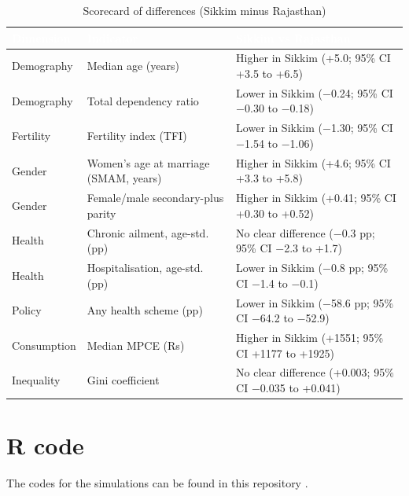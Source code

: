 \documentclass[10pt,a4paper]{article}
\begin{document}
\begin{table}[!htb]\centering
\caption{Scorecard of differences (Sikkim minus Rajasthan)}
\begin{tabular}{>{\raggedright\arraybackslash}p{2.32cm}>{\raggedright\arraybackslash}p{5.92cm}>{\raggedright\arraybackslash}p{7.92cm}}
\toprule
\rowcolor{navy}\textcolor{white}{\textbf{Dimension}} & \textcolor{white}{\textbf{Indicator}} & \textcolor{white}{\textbf{Sikkim vs Rajasthan}} \\
\midrule
Demography & Median age (years) & Higher in Sikkim (+5.0; 95\% CI +3.5 to +6.5) \\
Demography & Total dependency ratio & Lower in Sikkim ($-$0.24; 95\% CI $-$0.30 to $-$0.18) \\
Fertility & Fertility index (TFI) & Lower in Sikkim ($-$1.30; 95\% CI $-$1.54 to $-$1.06) \\
Gender & Women's age at marriage (SMAM, years) & Higher in Sikkim (+4.6; 95\% CI +3.3 to +5.8) \\
Gender & Female/male secondary-plus parity & Higher in Sikkim (+0.41; 95\% CI +0.30 to +0.52) \\
Health & Chronic ailment, age-std. (pp) & No clear difference ($-$0.3 pp; 95\% CI $-$2.3 to +1.7) \\
Health & Hospitalisation, age-std. (pp) & Lower in Sikkim ($-$0.8 pp; 95\% CI $-$1.4 to $-$0.1) \\
Policy & Any health scheme (pp) & Lower in Sikkim ($-$58.6 pp; 95\% CI $-$64.2 to $-$52.9) \\
Consumption & Median MPCE (Rs) & Higher in Sikkim (+1551; 95\% CI +1177 to +1925) \\
Inequality & Gini coefficient & No clear difference (+0.003; 95\% CI $-$0.035 to +0.041) \\
\bottomrule
\end{tabular}
\begin{minipage}{\textwidth}\par\vspace{2pt}{\footnotesize\itshape Notes: ``clear'' means the 95\% interval for the difference excludes zero (states treated as independent samples); pp = percentage points.\par}\end{minipage}
\end{table}

\newpage
\nocite{*}



\section*{R code}
The codes for the simulations can be found in this repository \cite{github-repo}.
\clearpage
\end{document}
